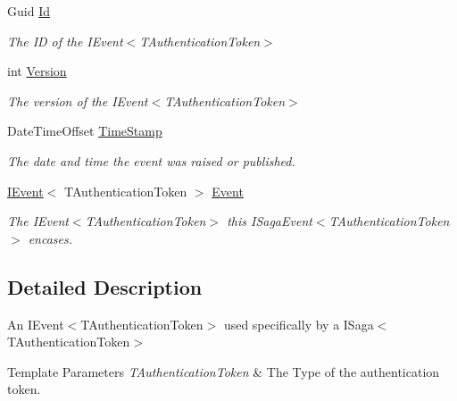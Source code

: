 \begin{DoxyCompactItemize}
Guid \hyperlink{classCqrs_1_1Events_1_1SagaEvent_a995f70a4311341459b96bd00488f0eea_a995f70a4311341459b96bd00488f0eea}{Id}
\begin{DoxyCompactList}\small\item\em The ID of the I\+Event$<$\+T\+Authentication\+Token$>$ \end{DoxyCompactList}\item 
int \hyperlink{classCqrs_1_1Events_1_1SagaEvent_a4918d2e0a66897600143f1e645a0f136_a4918d2e0a66897600143f1e645a0f136}{Version}
\begin{DoxyCompactList}\small\item\em The version of the I\+Event$<$\+T\+Authentication\+Token$>$ \end{DoxyCompactList}\item 
Date\+Time\+Offset \hyperlink{classCqrs_1_1Events_1_1SagaEvent_a6e522969d3456b62fe4291c5abc7e888_a6e522969d3456b62fe4291c5abc7e888}{Time\+Stamp}
\begin{DoxyCompactList}\small\item\em The date and time the event was raised or published. \end{DoxyCompactList}\item 
\hyperlink{interfaceCqrs_1_1Events_1_1IEvent}{I\+Event}$<$ T\+Authentication\+Token $>$ \hyperlink{classCqrs_1_1Events_1_1SagaEvent_ad965f37f2c485f04978237f0d1be9cb7_ad965f37f2c485f04978237f0d1be9cb7}{Event}
\begin{DoxyCompactList}\small\item\em The I\+Event$<$\+T\+Authentication\+Token$>$ this I\+Saga\+Event$<$\+T\+Authentication\+Token$>$ encases. \end{DoxyCompactList}\end{DoxyCompactItemize}


\subsection{Detailed Description}
An I\+Event$<$\+T\+Authentication\+Token$>$ used specifically by a I\+Saga$<$\+T\+Authentication\+Token$>$ 


\begin{DoxyTemplParams}{Template Parameters}
{\em T\+Authentication\+Token} & The Type of the authentication token.\\
\hline
\end{DoxyTemplParams}


